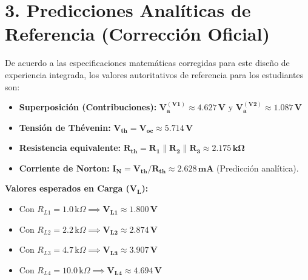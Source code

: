 \documentclass[11pt, a4paper]{article}
\begin{document}
\section*{3. Predicciones Analíticas de Referencia (Corrección Oficial)}
De acuerdo a las especificaciones matemáticas corregidas para este diseño de experiencia integrada, los valores autoritativos de referencia para los estudiantes son:
\begin{itemize}
    \item \textbf{Superposición (Contribuciones):} $\bm{V_a^{(V1)} \approx 4.627\,\text{V}}$ y $\bm{V_a^{(V2)} \approx 1.087\,\text{V}}$
    \item \textbf{Tensión de Thévenin:} $\bm{V_{th} = V_{oc} \approx 5.714\,\text{V}}$
    \item \textbf{Resistencia equivalente:} $\bm{R_{th} = R_1 \parallel R_2 \parallel R_3 \approx 2.175\,\text{k}\Omega}$
    \item \textbf{Corriente de Norton:} $\bm{I_N = V_{th}/R_{th} \approx 2.628\,\text{mA}}$ (Predicción analítica).
\end{itemize}

\textbf{Valores esperados en Carga ($\bm{V_L}$):}
\begin{itemize}\setlength\itemsep{-0.1em}
    \item Con $R_{L1} = 1.0\,\text{k}\Omega \implies \bm{V_{L1} \approx 1.800\,\text{V}}$
    \item Con $R_{L2} = 2.2\,\text{k}\Omega \implies \bm{V_{L2} \approx 2.874\,\text{V}}$
    \item Con $R_{L3} = 4.7\,\text{k}\Omega \implies \bm{V_{L3} \approx 3.907\,\text{V}}$
    \item Con $R_{L4} = 10.0\,\text{k}\Omega \implies \bm{V_{L4} \approx 4.694\,\text{V}}$
\end{itemize}
\end{document}
